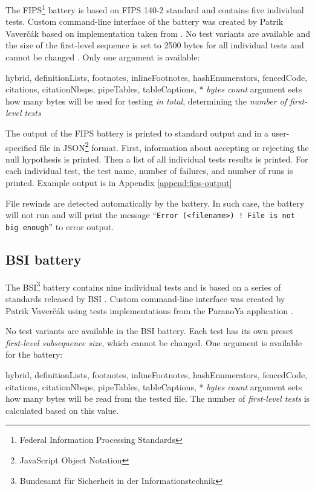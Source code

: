 \documentclass[
  digital,     %
  oneside,     %
  nosansbold,  %
  nocolorbold, %
  nolof,         %
  nolot,         %
]{fithesis4}
\begin{document}
The FIPS\footnote{Federal Information Processing Standards} battery is based on FIPS 140-2 standard \cite{fips_stand} and contains five individual tests. Custom command-line interface of the battery \cite{rtt-py-batteries} was created by Patrik Vaverčák based on implementation taken from \cite{fips-site}. No test variants are available and the size of the first-level sequence is set to 2500 bytes for all individual tests and cannot be changed \cite[p. 20]{vavercak}. Only one argument is available:
\begin{markdown*}{%
  hybrid,
  definitionLists,
  footnotes,
  inlineFootnotes,
  hashEnumerators,
  fencedCode,
  citations,
  citationNbsps,
  pipeTables,
  tableCaptions,
}
* \emph{bytes count} argument sets how many bytes will be used for testing \emph{in total}, determining the \emph{number of first-level tests} %
\end{markdown*}

The output of the FIPS battery is printed to standard output and in a user-specified file in JSON\footnote{JavaScript Object Notation} format. First, information about accepting or rejecting the null hypothesis is printed. Then a list of all individual tests results is printed. For each individual test, the test name, number of failures, and number of runs is printed. Example output is in Appendix \ref{append:fips-output}

File rewinds are detected automatically by the battery. In such case, the battery will not run and will print the message ``\texttt{Error (<filename>) ! File is not big enough}'' to error output.

\subsection{BSI battery} \label{chap:sols-bsi}
The BSI\footnote{Bundesamt für Sicherheit in der Informationstechnik} battery contains nine individual tests and is based on a series of standards released by BSI \cite{bsi_stand}. Custom command-line interface \cite{rtt-py-batteries} was created by Patrik Vaverčák using tests implementations from the ParanoYa application \cite[p. 16]{vavercak}.

No test variants are available in the BSI battery. Each test has its own preset \emph{first-level subsequence size}, which cannot be changed. One argument is available for the battery:
\begin{markdown*}{%
  hybrid,
  definitionLists,
  footnotes,
  inlineFootnotes,
  hashEnumerators,
  fencedCode,
  citations,
  citationNbsps,
  pipeTables,
  tableCaptions,
}
* \emph{bytes count} argument sets how many bytes will be read from the tested file. The number of \emph{first-level tests} is calculated based on this value.
\end{markdown*}
\end{document}

